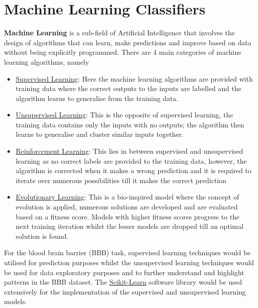 \documentclass[a4paper,12pt]{report}
\begin{document}
\chapter{Machine Learning Classifiers} \label{chapter:ml_classifier}
	\textbf{Machine Learning} is a sub-field of Artificial Intelligence that involves the design of algorithms that can learn, make predictions and improve based on data without being explicitly programmed. There are 4 main categories of machine learning algorithms, namely \cite{StephenM2014}
		\begin{itemize}
			\item \underline{Supervised Learning}: Here the machine learning algorithms are provided with training data where the correct outputs to the inputs are labelled and the algorithm learns to generalise from the training data.
			\item \underline{Unsupervised Learning}: This is the opposite of supervised learning, the training data contains only the inputs with no outputs; the algorithm then learns to generalise and cluster similar inputs together.
			\item \underline{Reinforcement Learning}: This lies in between supervised and unsupervised learning as no correct labels are provided to the training data, however, the algorithm is corrected when it makes a wrong prediction and it is required to iterate over numerous possibilities till it makes the correct prediction
			\item \underline{Evolutionary Learning}: This is a bio-inspired model where the concept of evolution is applied, numerous solutions are developed and are evaluated based on a fitness score. Models with higher fitness scores progress to the next training iteration whilst the lesser models are dropped till an optimal solution is found.
		\end{itemize}
	For the blood brain barrier (BBB) task, supervised learning techniques would be utilised for prediction purposes whilst the unsupervised learning techniques would be used for data exploratory purposes and to further understand and highlight patterns in the BBB dataset. The \href{http://scikit-learn.org/stable/}{Scikit-Learn} software library would be used extensively for the implementation of the supervised and unsupervised learning models.
	
\end{document}
